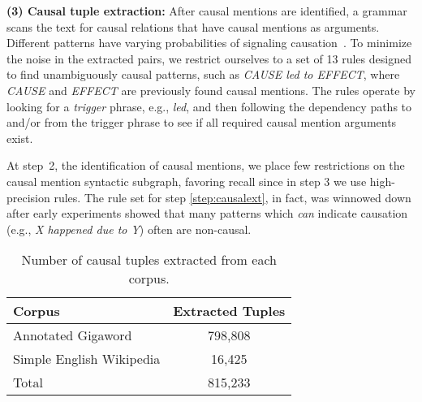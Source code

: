 {\flushleft \textbf{(3) Causal tuple extraction:}} \label{step:causalext} After causal mentions are identified, a grammar scans the text for causal relations that have causal mentions as arguments.  Different patterns have varying probabilities of signaling causation~\citep{khoo1998automatic}.  To minimize the noise in the extracted pairs, we restrict ourselves to a set of 13 rules designed to find unambiguously causal patterns, such as {\em CAUSE led to EFFECT}, where {\em CAUSE} and {\em EFFECT} are previously found causal mentions.
The rules operate by looking for a \emph{trigger} phrase, e.g., {\em led}, and then following the dependency paths to and/or from the trigger phrase to see if all required causal mention arguments exist.

At step~2, the identification of causal mentions, we place few restrictions on the causal mention syntactic subgraph, favoring recall since in step 3 we use high-precision rules.  The rule set for step \ref{step:causalext}, in fact, was winnowed down after early experiments showed that many patterns which \emph{can} indicate causation (e.g., {\em X happened due to Y}) often are non-causal.  

\begin{table}[t!]
\begin{center}
\begin{tabular}{lc}
\hline
Corpus		&	Extracted Tuples		 \\
\hline
Annotated Gigaword	& 798,808 	\\
Simple English Wikipedia		& 16,425 	\\
\hline
Total		& 815,233 	\\
\end{tabular}
\caption{{Number of causal tuples extracted from each corpus.}} 
\label{tab:causalstats}
\end{center}
\end{table}

